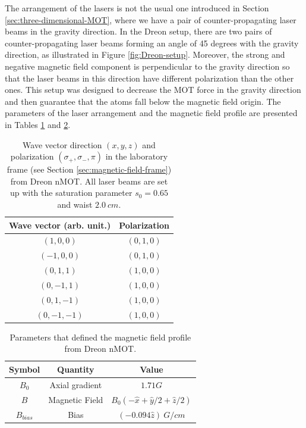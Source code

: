 The arrangement of the lasers is not the usual one introduced in Section \ref{sec:three-dimensional-MOT}, where we have a pair of counter-propagating laser beams in the gravity direction. In the Dreon setup, there are two pairs of counter-propagating laser beams forming an angle of 45 degrees with the gravity direction, as illustrated in Figure \ref{fig:Dreon-setup}. Moreover, the strong and negative magnetic field component is perpendicular to the gravity direction so that the laser beams in this direction have different polarization than the other ones. This setup was designed to decrease the MOT force in the gravity direction and then guarantee that the atoms fall below the magnetic field origin. The parameters of the laser arrangement and the magnetic field profile are presented in Tables \ref{tab:Dreon-laser-beams} and \ref{tab:Dreon-magnetic-field}.

\begin{table}[ht!]
    \centering
    \caption{Wave vector direction $ (x, y, z) $ and polarization $ (\sigma_+, \sigma_-, \pi) $ in the laboratory frame (see Section \ref{sec:magnetic-field-frame}) from Dreon nMOT. All laser beams are set up with the saturation parameter $ s_0 = 0.65 $ and waist $ 2.0\ cm $.}
    \begin{tabular}{|c|c|}
        \hline
        \textbf{Wave vector (arb. unit.)} & \textbf{Polarization} \\ \hline
        $ (1, 0, 0) $ & $ (0, 1, 0) $ \\
        $ (-1, 0, 0) $ & $ (0, 1, 0) $ \\
        $ (0, 1, 1) $ & $ (1, 0, 0) $ \\
        $ (0, -1, 1) $ & $ (1, 0, 0) $ \\
        $ (0, 1, -1) $ & $ (1, 0, 0) $ \\
        $ (0, -1, -1) $ & $ (1, 0, 0) $ \\
        \hline
    \end{tabular}
    \vspace{10px}
    \label{tab:Dreon-laser-beams}
\end{table}

\begin{table}[ht!]
    \centering
    \caption{Parameters that defined the magnetic field profile from Dreon nMOT.}
    \begin{tabular}{|c|c|c|}
        \hline
        \textbf{Symbol} & \textbf{Quantity} & \textbf{Value} \\ \hline
        $ B_0 $ & Axial gradient & $ 1.71 G $ \\
        $ B $ & Magnetic Field & $ B_0(-\hat{x} + \hat{y}/2 + \hat{z} / 2) $ \\
        $ B_{bias} $ & Bias & $ (-0.094 \hat{z})\ G / cm $ \\
        \hline
    \end{tabular}
    \vspace{10px}
    \label{tab:Dreon-magnetic-field}
\end{table}


